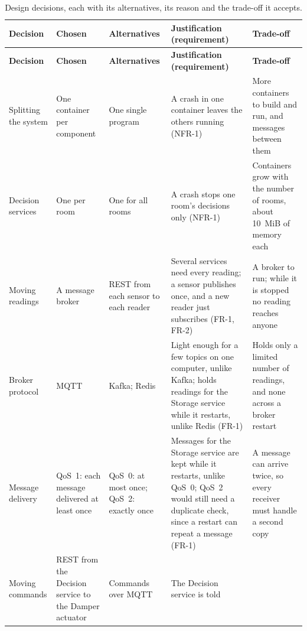 \documentclass[11pt]{article}
\makeatletter
\newcommand{\reqfield}[2]{\csname req@#1@#2\endcsname}
\newcommand{\req}[1]{\pdftooltip{\hyperlink{req:#1}{#1}}%
  {#1: \reqfield{#1}{text}. Criterion: \reqfield{#1}{criterion}.}}
\def\req#1{#1}}
\makeatother
\begin{document}
\begin{longtable}[]{@{}
  >{\raggedright\arraybackslash}p{}
  >{\raggedright\arraybackslash}p{}
  >{\raggedright\arraybackslash}p{}
  >{\raggedright\arraybackslash}p{}
  >{\raggedright\arraybackslash}p{}@{}}
\caption{Design decisions, each with its alternatives, its reason and
the trade-off it accepts.}\label{tab:decisions}\\
\toprule
\textbf{Decision} & \textbf{Chosen} & \textbf{Alternatives}
& \textbf{Justification (requirement)} & \textbf{Trade-off} \\
\midrule
\endfirsthead
\toprule
\textbf{Decision} & \textbf{Chosen} & \textbf{Alternatives}
& \textbf{Justification (requirement)} & \textbf{Trade-off} \\
\midrule
\endhead
Splitting the system & One container per component & One single
program & A crash in one container leaves the others running (\req{NFR-1})
& More containers to build and run, and messages between them \\
\midrule
Decision services & One per room & One for all rooms & A crash stops one
room's decisions only (\req{NFR-1}) & Containers grow with the number of
rooms, about 10~MiB of memory each \\
\midrule
Moving readings & A message broker & REST from each sensor to each
reader & Several services need every reading; a sensor publishes once,
and a new reader just subscribes (\req{FR-1}, \req{FR-2}) & A broker to run; while it
is stopped no reading reaches anyone \\
\midrule
Broker protocol & MQTT & Kafka; Redis & Light enough for a few topics on
one computer, unlike Kafka; holds readings for the Storage service while
it restarts, unlike Redis (\req{FR-1}) & Holds only a limited number of
readings, and none across a broker restart \\
\midrule
Message delivery & QoS~1: each message delivered at least once & QoS~0:
at most once; QoS~2: exactly once & Messages for the Storage service are
kept while it restarts, unlike QoS~0; QoS~2 would still need a duplicate
check, since a restart can repeat a message (\req{FR-1}) & A message can arrive twice, so every
receiver must handle a second copy \\
\midrule
Moving commands & REST from the Decision service to the Damper
actuator & Commands over MQTT & The Decision service is told

\end{longtable}
\end{document}
